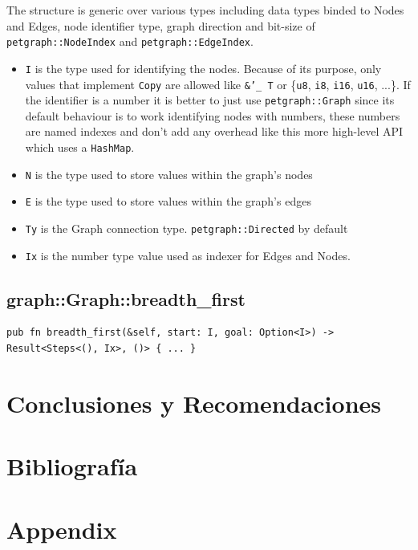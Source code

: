 The structure is generic over various types including data types binded to Nodes and Edges, node identifier type, graph direction and bit-size of
\texttt{petgraph::NodeIndex} and \texttt{petgraph::EdgeIndex}.

\begin{itemize}
 \item \texttt{I} is the type used for identifying the nodes. Because of its purpose, only values that implement
 \texttt{Copy} are allowed like \texttt{\&'\_ T} or \{\texttt{u8}, \texttt{i8}, \texttt{i16}, \texttt{u16}, ...\}. 
 If the identifier is a number it is better to just use \texttt{petgraph::Graph} since its default
 behaviour is to work identifying nodes with numbers, these numbers are named indexes and don't add any overhead
 like this more high-level API which uses a \texttt{HashMap}.
 \item \texttt{N} is the type used to store values within the graph's nodes
 \item \texttt{E} is the type used to store values within the graph's edges
 \item \texttt{Ty} is the Graph connection type. \texttt{petgraph::Directed} by default
 \item \texttt{Ix} is the number type value used as indexer for Edges and Nodes.
\end{itemize}

\subsection{graph::Graph::breadth\_first}
\begin{verbatim}
pub fn breadth_first(&self, start: I, goal: Option<I>) -> Result<Steps<(), Ix>, ()> { ... }
\end{verbatim}



\newpage
\section{Conclusiones y Recomendaciones}


\newpage
\section{Bibliografía}
\printbibliography[heading=none]

\newpage
\appendix

\section{Appendix}

